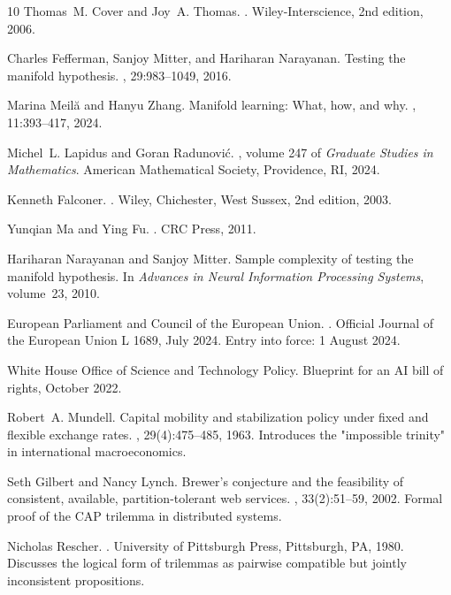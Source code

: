 \documentclass[11pt,letter,leqno]{article}
\begin{document}
\begin{thebibliography}{10}
Thomas~M. Cover and Joy~A. Thomas.
.
\newblock Wiley-Interscience, 2nd edition, 2006.

Charles Fefferman, Sanjoy Mitter, and Hariharan Narayanan.
\newblock Testing the manifold hypothesis.
, 29:983--1049,
  2016.

Marina Meil\u{a} and Hanyu Zhang.
\newblock Manifold learning: What, how, and why.
, 11:393--417,
  2024.

Michel~L. Lapidus and Goran Radunovi\'{c}.
, volume 247 of {\em Graduate Studies in
  Mathematics}.
\newblock American Mathematical Society, Providence, RI, 2024.

Kenneth Falconer.
.
\newblock Wiley, Chichester, West Sussex, 2nd edition, 2003.

Yunqian Ma and Ying Fu.
.
\newblock CRC Press, 2011.

Hariharan Narayanan and Sanjoy Mitter.
\newblock Sample complexity of testing the manifold hypothesis.
\newblock In {\em Advances in Neural Information Processing Systems},
  volume~23, 2010.

{European Parliament and Council of the European Union}.
.
\newblock Official Journal of the European Union L 1689, July 2024.
\newblock Entry into force: 1 August 2024.

{White House Office of Science and Technology Policy}.
\newblock Blueprint for an {AI} bill of rights, October 2022.

Robert~A. Mundell.
\newblock Capital mobility and stabilization policy under fixed and flexible
  exchange rates.
,
  29(4):475--485, 1963.
\newblock Introduces the "impossible trinity" in international macroeconomics.

Seth Gilbert and Nancy Lynch.
\newblock Brewer's conjecture and the feasibility of consistent, available,
  partition-tolerant web services.
, 33(2):51--59, 2002.
\newblock Formal proof of the CAP trilemma in distributed systems.

Nicholas Rescher.
.
\newblock University of Pittsburgh Press, Pittsburgh, PA, 1980.
\newblock Discusses the logical form of trilemmas as pairwise compatible but
  jointly inconsistent propositions.

\end{thebibliography}
\end{document}
